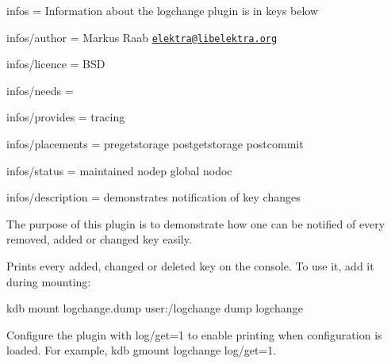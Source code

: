 
\begin{DoxyItemize}
\item infos = Information about the logchange plugin is in keys below
\item infos/author = Markus Raab \href{mailto:elektra@libelektra.org}{\tt elektra@libelektra.\+org}
\item infos/licence = B\+SD
\item infos/needs =
\item infos/provides = tracing
\item infos/placements = pregetstorage postgetstorage postcommit
\item infos/status = maintained nodep global nodoc
\item infos/description = demonstrates notification of key changes
\end{DoxyItemize}

The purpose of this plugin is to demonstrate how one can be notified of every removed, added or changed key easily.

Prints every added, changed or deleted key on the console. To use it, add it during mounting\+:


\begin{DoxyCode}
kdb mount logchange.dump user:/logchange dump logchange
\end{DoxyCode}


Configure the plugin with {\ttfamily log/get=1} to enable printing when configuration is loaded. For example, {\ttfamily kdb gmount logchange log/get=1}. 